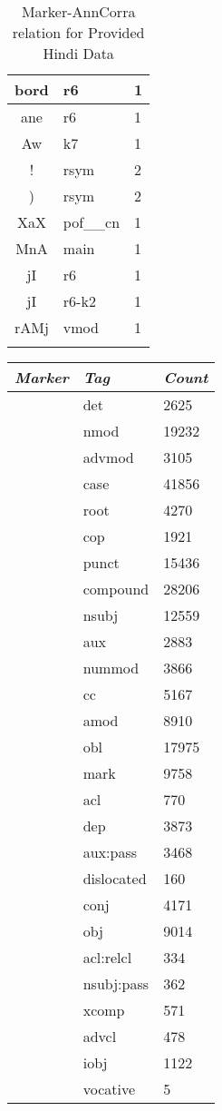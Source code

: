 \documentclass[a4 paper]{article}
\begin{document}
\begin{longtable}{cp{}p{}}
bord & r6 & 1\\ \midrule 
ane & r6 & 1\\ \midrule 
Aw & k7 & 1\\ \midrule 
! & rsym & 2\\ \midrule 
) & rsym & 2\\ \midrule 
XaX & pof\_\_cn & 1\\ \midrule 
MnA & main & 1\\ \midrule 
jI & r6 & 1\\ \midrule jI & r6-k2 & 1\\ \midrule 
rAMj & vmod & 1\\ \midrule 
\caption{Marker-AnnCorra relation for Provided Hindi Data}
\label{tab:markeranntable}
\end{longtable}


\begin{longtable}{cp{}p{}}
    \toprule
    \textit{Marker} & \textit{Tag} & \textit{Count} \\ 
    \toprule
 & det & 2625\\ \midrule  & nmod & 19232\\ \midrule  & advmod & 3105\\ \midrule  & case & 41856\\ \midrule  & root & 4270\\ \midrule  & cop & 1921\\ \midrule  & punct & 15436\\ \midrule  & compound & 28206\\ \midrule  & nsubj & 12559\\ \midrule  & aux & 2883\\ \midrule  & nummod & 3866\\ \midrule  & cc & 5167\\ \midrule  & amod & 8910\\ \midrule  & obl & 17975\\ \midrule  & mark & 9758\\ \midrule  & acl & 770\\ \midrule  & dep & 3873\\ \midrule  & aux:pass & 3468\\ \midrule  & dislocated & 160\\ \midrule  & conj & 4171\\ \midrule  & obj & 9014\\ \midrule  & acl:relcl & 334\\ \midrule  & nsubj:pass & 362\\ \midrule  & xcomp & 571\\ \midrule  & advcl & 478\\ \midrule  & iobj & 1122\\ \midrule  & vocative & 5\\ \midrule 

\end{longtable}
\end{document}

